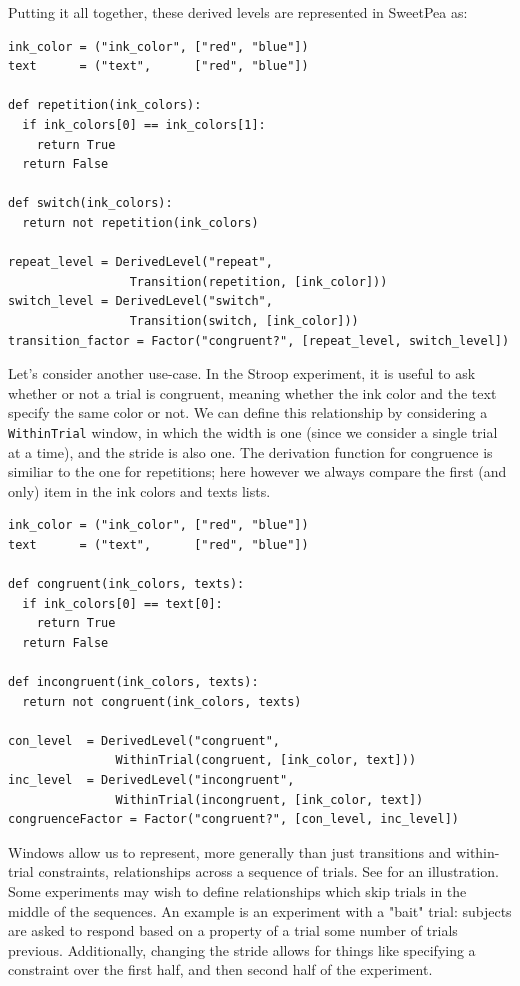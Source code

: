 Putting it all together, these derived levels are represented in SweetPea as:

\begin{verbatim}
ink_color = ("ink_color", ["red", "blue"])
text      = ("text",      ["red", "blue"])

def repetition(ink_colors):
  if ink_colors[0] == ink_colors[1]:
    return True
  return False

def switch(ink_colors):
  return not repetition(ink_colors)

repeat_level = DerivedLevel("repeat",
                 Transition(repetition, [ink_color]))
switch_level = DerivedLevel("switch",
                 Transition(switch, [ink_color]))
transition_factor = Factor("congruent?", [repeat_level, switch_level])

\end{verbatim}

Let's consider another use-case. In the Stroop experiment, it is useful to ask whether or not a trial is congruent, meaning whether the ink color and the text specify the same color or not. We can define this relationship by considering a \texttt{WithinTrial} window, in which the width is one (since we consider a single trial at a time), and the stride is also one. The derivation function for congruence is similiar to the one for repetitions; here however we always compare the first (and only) item in the ink colors and texts lists.

\begin{verbatim}
ink_color = ("ink_color", ["red", "blue"])
text      = ("text",      ["red", "blue"])

def congruent(ink_colors, texts):
  if ink_colors[0] == text[0]:
    return True
  return False

def incongruent(ink_colors, texts):
  return not congruent(ink_colors, texts)

con_level  = DerivedLevel("congruent",
               WithinTrial(congruent, [ink_color, text]))
inc_level  = DerivedLevel("incongruent",
               WithinTrial(incongruent, [ink_color, text])
congruenceFactor = Factor("congruent?", [con_level, inc_level])

\end{verbatim}

Windows allow us to represent, more generally than just transitions and within-trial constraints, relationships across a sequence of trials. See  for an illustration. Some experiments may wish to define relationships which skip trials in the middle of the sequences. An example is an experiment with a "bait" trial: subjects are asked to respond based on a property of a trial some number of trials previous. Additionally, changing the stride allows for things like specifying a constraint over the first half, and then second half of the experiment.

